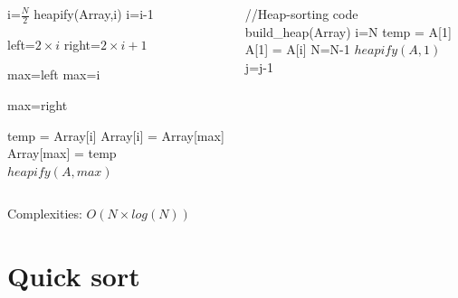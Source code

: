 \documentclass{beamer}[10pt, usepdftitle=false, handout]
\begin{document}
	\begin{frame}
	
	\begin{columns}[c]
	\begin{center}    
    \scalebox{0.55} {
    \begin{algorithm}[H]
    \SetAlgoLined   
	 {
		i=$\frac{N}{2}$\;
		 {
			heapify(Array,i)\;	
			i=i-1\;	
		}	
	}
	
	\vspace*{1em}
	 {
		left=$2\times i$\;	
		right=$2\times i+1$\;
	
		 {
			max=left\;
		} {
			max=i\;
		}	
		
		 {
			max=right\;
		}		
		
		 {
			temp = Array[i]\;
			Array[i] = Array[max]\;
			Array[max] = temp\;
			$heapify(A, max)$\;		
		}	
	}
	  
    
	\end{algorithm}	
	}
	\end{center}			
	
	\begin{flushleft}	
	\scalebox{0.55} {
	
	\begin{algorithm}[H] 

	//Heap-sorting code \\
	build\_heap(Array)\;
	i=N\;
	 {
		temp = A[1]\;
		A[1] = A[i]\;
		N=N-1\;
		$heapify(A, 1)$\;	
		j=j-1\;
	}	
	\end{algorithm}
	}
	\end{flushleft}	
		
	\end{columns}	
	
	\vspace*{2em}	
	
	Complexities: $O(N\times log(N))$	
	
	\end{frame}


	\section {Quick sort}
\end{document}
